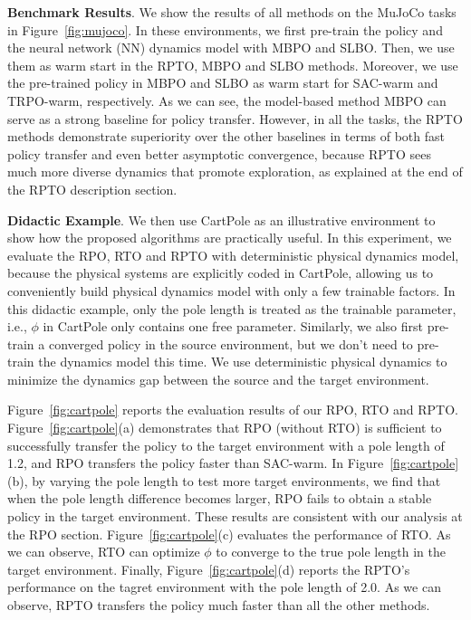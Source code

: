 \documentclass[letterpaper]{article} %
\begin{document}
\textbf{Benchmark Results}.
We show the results of all methods on the MuJoCo tasks in Figure~\ref{fig:mujoco}. 
In these environments, we first pre-train the policy and the neural network (NN) dynamics model with MBPO and SLBO. Then, we use them as warm start in the RPTO, MBPO and SLBO methods. 
Moreover, we use the pre-trained policy in MBPO and SLBO as warm start for SAC-warm and TRPO-warm, respectively.
As we can see, the model-based method MBPO can serve as a strong baseline for policy transfer. 
However, in all the tasks, the RPTO methods demonstrate superiority over the other baselines in terms of both fast policy transfer and even better asymptotic convergence, because RPTO sees much more diverse dynamics that promote exploration, as explained at the end of the RPTO description section.



\textbf{Didactic Example}.
We then use CartPole as an illustrative environment to show how the proposed algorithms are practically useful. 
In this experiment, we evaluate the RPO, RTO and RPTO with deterministic physical dynamics model, because the physical systems are explicitly coded in CartPole, allowing us to conveniently build physical dynamics model with only a few trainable factors.
In this didactic example, only the pole length is treated as the trainable parameter, i.e., $\phi$ in CartPole only contains one free parameter. 
Similarly, we also first pre-train a converged policy in the source environment, but we don't need to pre-train the dynamics model this time.
We use deterministic physical dynamics to minimize the dynamics gap between the source and the target environment.

Figure~\ref{fig:cartpole} reports the evaluation results of our RPO, RTO and RPTO. Figure~\ref{fig:cartpole}(a) demonstrates that RPO (without RTO) is sufficient to successfully transfer the policy to the target environment with a pole length of 1.2, and RPO transfers the policy faster than SAC-warm. In Figure~\ref{fig:cartpole}(b), by varying the pole length to test more target environments, we find that when the pole length difference becomes larger, RPO fails to obtain a stable policy in the target environment. 
These results are consistent with our analysis at the RPO section.
Figure~\ref{fig:cartpole}(c) evaluates the performance of RTO. As we can observe, RTO can optimize $\phi$ to converge to the true pole length in the target environment. 
Finally, Figure~\ref{fig:cartpole}(d) reports the RPTO's performance on the tagret environment with the pole length of 2.0.
As we can observe, RPTO transfers the policy much faster than all the other methods.
\end{document}
